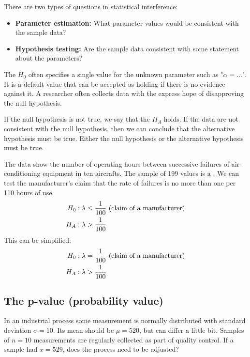 There are two types of questions in statistical interference:
\begin{itemize}
    \item \textbf{Parameter estimation:} What parameter values would be consistent with the sample data?
    \item \textbf{Hypothesis testing:} Are the sample data consistent with some statement about the parameters?
\end{itemize}

The  $H_0$ often specifies a single value for the unknown parameter such as "$\alpha = \dots$". It is a default value that can be accepted as holding if there is no evidence against it. A researcher often collects data with the express hope of disapproving the null hypothesis.

If the null hypothesis is not true, we say that the  $H_A$ holds. If the data are not consistent with the null hypothesis, then we can conclude that the alternative hypothesis must be true. Either the null hypothesis or the alternative hypothesis must be true.

\begin{example}
    The data show the number of operating hours between successive failures of air-conditioning equipment in ten aircrafts. The sample of 199 values is a . We can test the manufacturer's claim that the rate of failures is no more than one per 110 hours of use.
    \begin{align}
        H_0: \lambda &\le \frac{1}{100}\text{ (claim of a manufacturer)} \notag \\
        H_A: \lambda &> \frac{1}{100} \notag
    \end{align}
    This can be simplified: \\
    \begin{align}
        H_0: \lambda &= \frac{1}{100}\text{ (claim of a manufacturer)} \notag \\
        H_A: \lambda &> \frac{1}{100} \notag
    \end{align}
\end{example}

\subsection{The p-value (probability value)}

In an industrial process some measurement is normally distributed with standard deviation $\sigma = 10$. Its mean should be $\mu = 520$, but can differ a little bit. Samples of $n=10$ measurements are regularly collected as part of quality control. If a sample had $\bar{x}=529$, does the process need to be adjusted?

